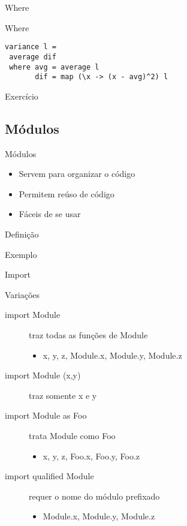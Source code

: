 \documentclass{beamer}
\begin{document}
		\begin{frame}[fragile]{Where}
		 \begin{block}{Where}
		  \begin{lstlisting}
variance l =
 average dif
 where avg = average l
       dif = map (\x -> (x - avg)^2) l
		  \end{lstlisting}
		 \end{block}		 
		\end{frame}
		
		\begin{frame}{Exercício}
		 
		\end{frame}
		
		\subsection{Módulos}
			\begin{frame}[fragile]{Módulos}
			 \begin{itemize}
			  \item Servem para organizar o código
			  \item Permitem reúso de código
			  \item Fáceis de se usar
			 \end{itemize}
			\end{frame}
			
			\begin{frame}[fragile]{Definição}
			 \begin{block}{Exemplo}
			  
			 \end{block}
			\end{frame}
			
			\begin{frame}[fragile]{Import}
			 \begin{block}{Variações}
			  \begin{description}
			   \item [import Module] traz todas as funções de Module
					\begin{itemize}
					 \item x, y, z, Module.x, Module.y, Module.z
					\end{itemize}
				 \item [import Module (x,y)] traz somente x e y
				 \item [import Module as Foo] trata Module como Foo
					\begin{itemize}
					 \item x, y, z, Foo.x, Foo.y, Foo.z
					\end{itemize}

			   \item [import qualified Module] requer o nome do módulo prefixado
					\begin{itemize}
					 \item Module.x, Module.y, Module.z
					\end{itemize}
			  \end{description}			  
			 \end{block}
			\end{frame}
			
\end{document}
